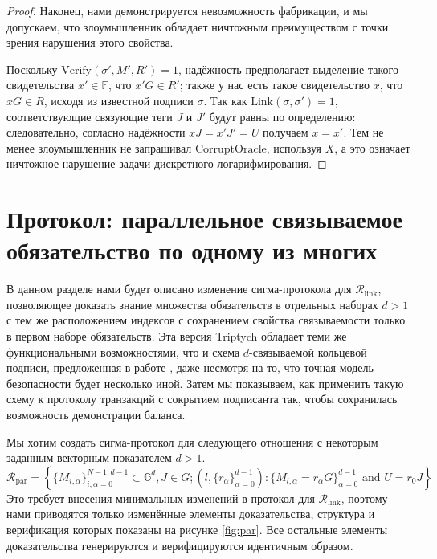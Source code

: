 \documentclass{article}
\newcommand{\G}{\mathbb{G}}
\newcommand{\F}{\mathbb{F}}
\theoremstyle{definition}
\begin{document}
\begin{proof}
Наконец, нами демонстрируется невозможность фабрикации, и мы допускаем, что злоумышленник обладает ничтожным преимуществом с точки зрения нарушения этого свойства.

Поскольку $\text{Verify}(\sigma',M',R') = 1$, надёжность предполагает выделение такого свидетельства $x' \in \F$, что $x'G \in R'$; также у нас есть такое свидетельство $x$, что $xG \in R$, исходя из известной подписи $\sigma$.
Так как $\text{Link}(\sigma,\sigma') = 1$, соответствующие связующие теги $J$ и $J'$ будут равны по определению: следовательно, согласно надёжности $xJ = x'J' = U$ получаем $x = x'$.
Тем не менее злоумышленник не запрашивал $\text{CorruptOracle}$, используя $X$, а это означает ничтожное нарушение задачи дискретного логарифмирования.
\end{proof}


\section{Протокол: параллельное связываемое обязательство по одному из многих}
В данном разделе нами будет описано изменение сигма-протокола для $\mathcal{R}_{\text{link}}$, позволяющее доказать знание множества обязательств в отдельных наборах $d > 1$ с тем же расположением индексов с сохранением свойства связываемости только в первом наборе обязательств.
Эта версия Triptych обладает теми же функциональными возможностями, что и схема $d$-связываемой кольцевой подписи, предложенная в работе \cite{clsag}, даже несмотря на то, что точная модель безопасности будет несколько иной. Затем мы показываем, как применить такую схему к протоколу транзакций с сокрытием подписанта так, чтобы сохранилась возможность демонстрации баланса.

Мы хотим создать сигма-протокол для следующего отношения с некоторым заданным векторным показателем $d > 1$.
$$\mathcal{R}_{\text{par}} = \left\{ \{M_{i,\alpha}\}_{i,\alpha=0}^{N-1,d-1} \subset \G^d, J \in G ; \left(l, \{r_\alpha\}_{\alpha=0}^{d-1}\right) : \{M_{l,\alpha} = r_\alpha G\}_{\alpha=0}^{d-1} \text{ and } U = r_0 J \right\}$$
Это требует внесения минимальных изменений в протокол для $\mathcal{R}_{\text{link}}$, поэтому нами приводятся только изменённые элементы доказательства, структура и верификация которых показаны на рисунке \ref{fig:par}.
Все остальные элементы доказательства генерируются и верифицируются идентичным образом.
\end{document}
